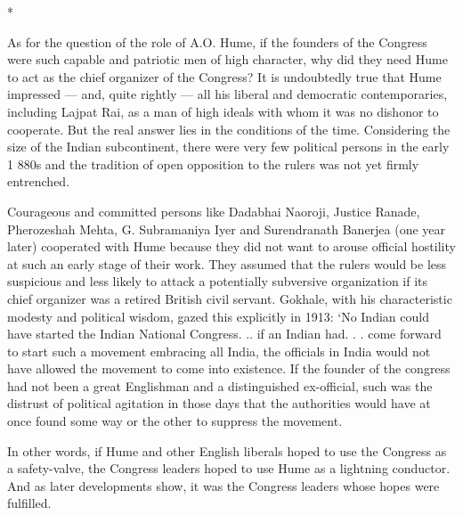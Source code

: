 \begin{center}*\end{center}



As for the question of the role of A.O. Hume, if the founders of the Congress were such capable and patriotic men of high character, why did they need Hume to act as the chief organizer of the Congress? It is undoubtedly true that Hume impressed — and, quite rightly — all his liberal and democratic contemporaries, including Lajpat Rai, as a man of high ideals with whom it was no dishonor to cooperate. But the real answer lies in the conditions of the time. Considering the size of the Indian subcontinent, there were very few political persons in the early 1 880s and the tradition of open opposition to the rulers was not yet firmly entrenched.

Courageous and committed persons like Dadabhai Naoroji, Justice Ranade, Pherozeshah Mehta, G. Subramaniya Iyer and Surendranath Banerjea (one year later) cooperated with Hume because they did not want to arouse official hostility at such an early stage of their work. They assumed that the rulers would be less suspicious and less likely to attack a potentially subversive organization if its chief organizer was a retired British civil servant. Gokhale, with his characteristic modesty and political wisdom, gazed this explicitly in 1913: ‘No Indian could have started the Indian National Congress. .. if an Indian had. . . come forward to start such a movement embracing all India, the officials in India would not have allowed the movement to come into existence. If the founder of the congress had not been a great Englishman and a distinguished ex-official, such was the distrust of political agitation in those days that the authorities would have at once found some way or the other to suppress the movement.

In other words, if Hume and other English liberals hoped to use the Congress as a safety-valve, the Congress leaders hoped to use Hume as a lightning conductor. And as later developments show, it was the Congress leaders whose hopes were fulfilled.
